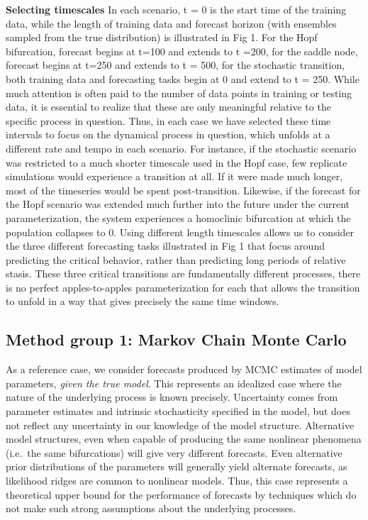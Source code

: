 \documentclass{article}
\begin{document}
\textbf{Selecting timescales} In each scenario, t = 0 is the start time
of the training data, while the length of training data and forecast
horizon (with ensembles sampled from the true distribution) is
illustrated in Fig 1. For the Hopf bifurcation, forecast begins at t=100
and extends to t =200, for the saddle node, forecast begins at t=250 and
extends to t = 500, for the stochastic transition, both training data
and forecasting tasks begin at 0 and extend to t = 250. While much
attention is often paid to the number of data points in training or
testing data, it is essential to realize that these are only meaningful
relative to the specific process in question. Thus, in each case we have
selected these time intervals to focus on the dynamical process in
question, which unfolds at a different rate and tempo in each scenario.
For instance, if the stochastic scenario was restricted to a much
shorter timescale used in the Hopf case, few replicate simulations would
experience a transition at all. If it were made much longer, most of the
timeseries would be spent post-transition. Likewise, if the forecast for
the Hopf scenario was extended much further into the future under the
current parameterization, the system experiences a homoclinic
bifurcation at which the population collapses to 0. Using different
length timescales allows us to consider the three different forecasting
tasks illustrated in Fig 1 that focus around predicting the critical
behavior, rather than predicting long periods of relative stasis. These
three critical transitions are fundamentally different processes, there
is no perfect apples-to-apples parameterization for each that allows the
transition to unfold in a way that gives precisely the same time
windows.

\hypertarget{method-group-1-markov-chain-monte-carlo}{%
\subsection{Method group 1: Markov Chain Monte
Carlo}\label{method-group-1-markov-chain-monte-carlo}}

As a reference case, we consider forecasts produced by MCMC estimates of
model parameters, \emph{given the true model}. This represents an
idealized case where the nature of the underlying process is known
precisely. Uncertainty comes from parameter estimates and intrinsic
stochasticity specified in the model, but does not reflect any
uncertainty in our knowledge of the model structure. Alternative model
structures, even when capable of producing the same nonlinear phenomena
(i.e.~the same bifurcations) will give very different forecasts. Even
alternative prior distributions of the parameters will generally yield
alternate forecasts, as likelihood ridges are common to nonlinear
models. Thus, this case represents a theoretical upper bound for the
performance of forecasts by techniques which do not make such strong
assumptions about the underlying processes.
\end{document}
